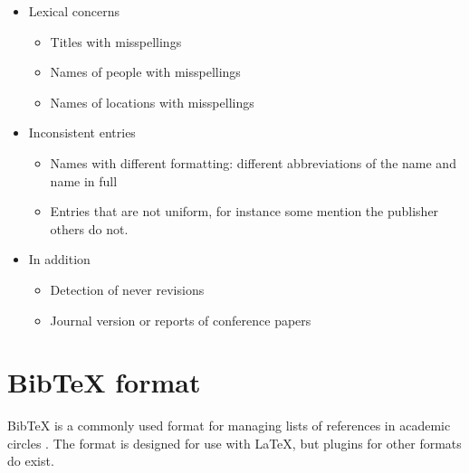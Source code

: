 
\begin{itemize}
\item Lexical concerns
  \begin{itemize}
  \item Titles with misspellings
  \item Names of people with misspellings
  \item Names of locations with misspellings
  \end{itemize}
\item Inconsistent entries
  \begin{itemize}
  \item Names with different formatting: different
    abbreviations of the name and name in full
  \item Entries that are not uniform, for instance some mention the
    publisher others do not.
  \end{itemize}
\item In addition
  \begin{itemize}
  \item Detection of never revisions
  \item Journal version or reports of conference papers
  \end{itemize}
\end{itemize}


\section{Bib{\TeX} format}
Bib{\TeX} is a commonly used format for managing lists of references in
academic circles .  The format is
designed for use with {\LaTeX}, but plugins for other formats do
exist. \autocite{bibtex_resource}

